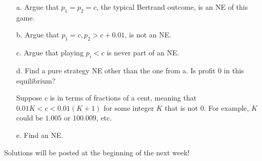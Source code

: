 \documentclass{article}
\begin{document}
\begin{enumerate}
    \begin{enumerate}
        \item[a.]  Argue that $p_1=p_2=c$, the typical Bertrand outcome, is an NE of this game.
        
        \vspace{4cm}
        
        \item[b.] Argue that $p_1=c, p_2>c+0.01$, is not an NE.
        
        \vspace{4cm}
        
        \item[c.] Argue that playing $p_i<c$ is never part of an NE.
        
        \vspace{4cm}
        \item[d.] Find a pure strategy NE other than the one from a. Is profit 0 in this equilibrium?
       
       \vspace{4cm}
       
       Suppose $c$ is in terms of fractions of a cent, meaning that $0.01K<c<0.01(K+1)$ for some integer $K$ that is not 0. For example, $K$ could be $1.005$ or $100.009$, etc.
       
        \item[e.] Find an NE.
        
        \vspace{6cm}
    \end{enumerate}
\end{enumerate}

Solutions will be posted at the beginning of the next week!
\end{document}
